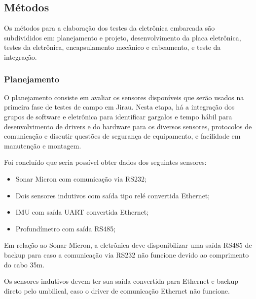 


\subsection{Métodos}
Os métodos para a elaboração dos testes da eletrônica embarcada são subdivididos
em: planejamento e projeto, desenvolvimento da placa eletrônica, testes da
eletrônica, encapsulamento mecânico e cabeamento, e teste da integração.

\subsubsection{Planejamento}
O planejamento consiste em avaliar os sensores disponíveis que serão usados na
primeira fase de testes de campo em Jirau. Nesta etapa, há a integração dos
grupos de software e eletrônica para identificar gargalos e tempo hábil para
desenvolvimento de drivers e do hardware para os diversos sensores, protocolos
de comunicação e discutir questões de segurança de equipamento, e facilidade em
manutenção e montagem.

Foi concluído que seria possível obter dados dos seguintes sensores: 
\begin{itemize}
  \item Sonar Micron com comunicação via RS232;
  \item Dois sensores indutivos com saída tipo relé convertida Ethernet;
  \item IMU com saída UART convertida Ethernet;
  \item Profundímetro com saída RS485;
\end{itemize}
Em relação ao Sonar Micron, a eletrônica deve disponibilizar uma saída RS485
de backup para caso a comunicação via RS232 não funcione devido ao comprimento
do cabo 35m.

Os sensores indutivos devem ter sua saída convertida para Ethernet e
backup direto pelo umbilical, caso o driver de comunicação Ethernet não
funcione.

